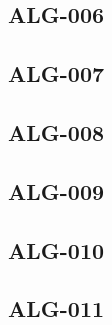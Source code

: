 \begin{multicols}{2}
\renewcommand{\xxexo}{ALG-006}
\subsection*{\xxexo}
\graphicspath{{../../exos/algo/\xxexo/}}


\renewcommand{\xxexo}{ALG-007}
\subsection*{\xxexo}
\graphicspath{{../../exos/algo/\xxexo/}}


\renewcommand{\xxexo}{ALG-008}
\subsection*{\xxexo}
\graphicspath{{../../exos/algo/\xxexo/}}


\renewcommand{\xxexo}{ALG-009}
\subsection*{\xxexo}
\graphicspath{{../../exos/algo/\xxexo/}}


\renewcommand{\xxexo}{ALG-010}
\subsection*{\xxexo}
\graphicspath{{../../exos/algo/\xxexo/}}


\renewcommand{\xxexo}{ALG-011}
\subsection*{\xxexo}
\graphicspath{{../../exos/algo/\xxexo/}}




\end{multicols}




